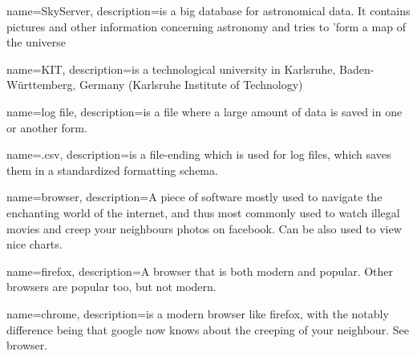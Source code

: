{
  name=SkyServer,
  description={is a big database for astronomical data. It contains pictures
              and other information concerning astronomy and tries to 'form a 
              map of the universe
              }
}


{
  name=KIT,
  description={is a technological university in Karlsruhe, Baden-Württemberg, Germany 
              (Karlsruhe Institute of Technology)}
}

{
  name=log file,
  description={is a file where a large amount of data is saved in one or another form.}
}

{
  name=.csv,
  description={is a file-ending which is used for log files, 
  which saves them in a standardized formatting schema.}
}

{
  name=browser,
  description={A piece of software mostly used to navigate the enchanting world of the internet, and thus most commonly
used to watch illegal movies and creep your neighbours photos on facebook. Can be also used to view nice charts.}
}

{
  name=firefox,
  description={A browser that is both modern and popular. Other browsers are popular too, but not modern. }
}

{
  name=chrome,
  description={is a modern browser like firefox, with the notably difference being that google now knows about the
creeping of your neighbour. See browser.}
}


  